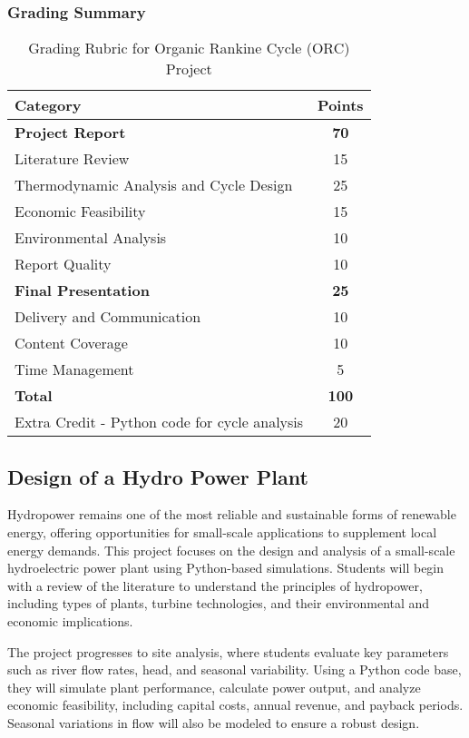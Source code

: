\documentclass[11pt]{article}
\begin{document}
\subsubsection*{Grading Summary}
\begin{table}[h!]
    \centering
    \begin{tabular}{|l|c|}
        \hline
        \textbf{Category} & \textbf{Points} \\
        \hline
        \textbf{Project Report} & \textbf{70} \\
        Literature Review & 15 \\
        Thermodynamic Analysis and Cycle Design & 25 \\
        Economic Feasibility & 15 \\
        Environmental Analysis & 10 \\
        Report Quality & 10 \\
        \hline
        \textbf{Final Presentation} & \textbf{25} \\
        Delivery and Communication & 10 \\
        Content Coverage & 10 \\
        Time Management & 5 \\
        \hline
        \textbf{Total} & \textbf{100} \\
        \hline
        Extra Credit - Python code for cycle analysis&20\\
        \hline
    \end{tabular}
    \caption{Grading Rubric for Organic Rankine Cycle (ORC) Project}
\end{table}
\newpage
\subsection{Design of a Hydro Power Plant}

Hydropower remains one of the most reliable and sustainable forms of renewable energy, offering opportunities for small-scale applications to supplement local energy demands. This project focuses on the design and analysis of a small-scale hydroelectric power plant using Python-based simulations. Students will begin with a review of the literature to understand the principles of hydropower, including types of plants, turbine technologies, and their environmental and economic implications.

The project progresses to site analysis, where students evaluate key parameters such as river flow rates, head, and seasonal variability. Using a Python code base, they will simulate plant performance, calculate power output, and analyze economic feasibility, including capital costs, annual revenue, and payback periods. Seasonal variations in flow will also be modeled to ensure a robust design.
\end{document}
